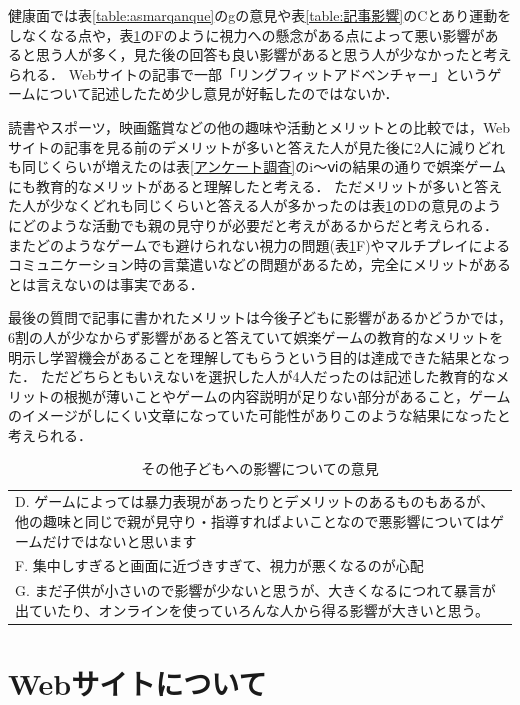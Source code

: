 \documentclass[12pt,a4j,titlepage]{ltjsarticle}
\begin{document}
健康面では表\ref{table:asmarqanque}のgの意見や表\ref{table:記事影響}のCとあり運動をしなくなる点や，表\ref{table:その他意見}のFのように視力への懸念がある点によって悪い影響があると思う人が多く，見た後の回答も良い影響があると思う人が少なかったと考えられる．
Webサイトの記事で一部「リングフィットアドベンチャー」というゲームについて記述したため少し意見が好転したのではないか．

読書やスポーツ，映画鑑賞などの他の趣味や活動とメリットとの比較では，Webサイトの記事を見る前のデメリットが多いと答えた人が見た後に2人に減りどれも同じくらいが増えたのは表\ref{アンケート調査}のi～ⅵの結果の通りで娯楽ゲームにも教育的なメリットがあると理解したと考える．
ただメリットが多いと答えた人が少なくどれも同じくらいと答える人が多かったのは表\ref{table:その他意見}のDの意見のようにどのような活動でも親の見守りが必要だと考えがあるからだと考えられる．
またどのようなゲームでも避けられない視力の問題(表\ref{table:その他意見}F)やマルチプレイによるコミュニケーション時の言葉遣いなどの問題があるため，完全にメリットがあるとは言えないのは事実である．

最後の質問で記事に書かれたメリットは今後子どもに影響があるかどうかでは，6割の人が少なからず影響があると答えていて娯楽ゲームの教育的なメリットを明示し学習機会があることを理解してもらうという目的は達成できた結果となった．
ただどちらともいえないを選択した人が4人だったのは記述した教育的なメリットの根拠が薄いことやゲームの内容説明が足りない部分があること，ゲームのイメージがしにくい文章になっていた可能性がありこのような結果になったと考えられる．

\begin{table}[H]
 \caption{その他子どもへの影響についての意見}
 \label{table:その他意見}
 \small
 \centering
  \begin{tabular}{l}
  \hline
   D. ゲームによっては暴力表現があったりとデメリットのあるものもあるが、他の趣味と同じで親が見守り・指導すればよいことなので悪影響についてはゲームだけではないと思います\\
   F. 集中しすぎると画面に近づきすぎて、視力が悪くなるのが心配 \\
   G. まだ子供が小さいので影響が少ないと思うが、大きくなるにつれて暴言が出ていたり、オンラインを使っていろんな人から得る影響が大きいと思う。 \\
   \hline
  \end{tabular}
\end{table}

\section{Webサイトについて}\label{Webサイトについて}
\end{document}
